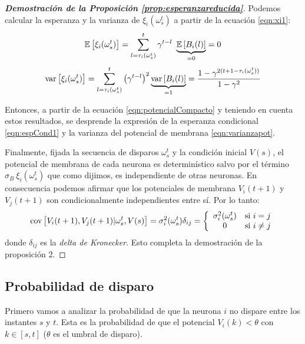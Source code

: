 \begin{proof}[\bf{Demostración de la Proposición \ref{prop:esperanzareducida}}]
Podemos calcular la esperanza y la varianza de $\xi_i(\omega_s^t)$ a partir de la ecuación \eqref{eqn:xi1}:
\begin{equation*}
    \mathbb{E} \left[\xi_i(\omega_s^t)\right] = \sum_{l=\tau_i(\omega_s^t)}^t \gamma^{t-l} \  \underbrace{\mathbb{E} \left[B_i(l)\right]}_{=0}=0
\end{equation*}
\begin{equation*}
    \text{var}\left[\xi_i(\omega_s^t)\right] = \sum_{l=\tau_i(\omega_s^t)}^t \left(\gamma^{t-l}\right)^2 \underbrace{\text{var}\left[B_i(l)\right]}_{=1} = \frac{1-\gamma^{2(t+1-\tau_i(\omega_s^t))}}{1-\gamma^2}
\end{equation*}

Entonces, a partir de la ecuación \eqref{eqn:potencialCompacto} y teniendo en cuenta estos resultados, se desprende la expresión de la esperanza condicional \eqref{eqn:espCond1} y la varianza del potencial de membrana \eqref{eqn:varianzapot}.

Finalmente, fijada la secuencia de disparos $\omega_s^t$ y la condición inicial $V(s)$, el potencial de membrana de cada neurona es determinístico salvo por el término $\sigma_B \  \xi_i(\omega_s^t)$ que como dijimos, es independiente de otras neuronas.
En consecuencia podemos afirmar que los potenciales de membrana $V_i(t+1)$ y $V_j(t+1)$ son condicionalmente independientes entre sí. Por lo tanto:
\begin{equation}
    \text{cov}\left[V_i(t+1),V_j(t+1)|\omega_s^t, V(s)\right] = \sigma_i^2(\omega_s^t) \delta_{ij} = \left\{ \begin{array}{cl}
            \sigma_i^2(\omega_s^t)   & \text{si } i=j\\ 
             0    & \text{si } i\neq j
        \end{array}\right.
\end{equation}
donde $\delta_{ij}$ es la \emph{delta de Kronecker}. Esto completa la demostración de la proposición 2.
\end{proof}

\subsection{Probabilidad de disparo}

Primero vamos a analizar la probabilidad de que la neurona $i$ no dispare entre los instantes $s$ y $t$. Esta es la probabilidad de que el potencial $V_i(k) < \theta$ con $k \in [s,t]$ ($\theta$ es el umbral de disparo).

